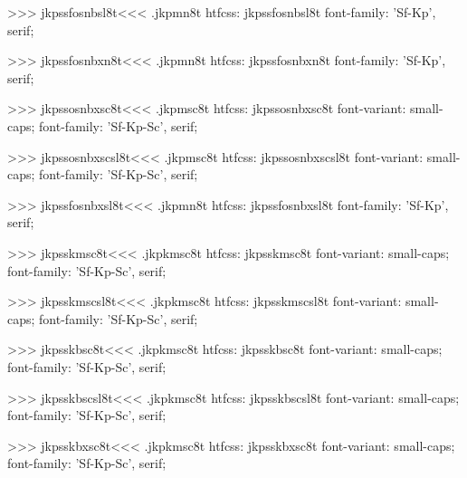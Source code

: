 >>>
\<jkpssfosnbsl8t\><<<
.jkpmn8t
htfcss:  jkpssfosnbsl8t  font-family: 'Sf-Kp', serif;

>>>
\<jkpssfosnbxn8t\><<<
.jkpmn8t
htfcss:  jkpssfosnbxn8t  font-family: 'Sf-Kp', serif;

>>>
\<jkpssosnbxsc8t\><<<
.jkpmsc8t
htfcss:  jkpssosnbxsc8t  font-variant: small-caps; font-family: 'Sf-Kp-Sc', serif;

>>>
\<jkpssosnbxscsl8t\><<<
.jkpmsc8t
htfcss:  jkpssosnbxscsl8t  font-variant: small-caps; font-family: 'Sf-Kp-Sc', serif;

>>>
\<jkpssfosnbxsl8t\><<<
.jkpmn8t
htfcss:  jkpssfosnbxsl8t  font-family: 'Sf-Kp', serif;

>>>
\<jkpsskmsc8t\><<<
.jkpkmsc8t
htfcss:  jkpsskmsc8t  font-variant: small-caps; font-family: 'Sf-Kp-Sc', serif;

>>>
\<jkpsskmscsl8t\><<<
.jkpkmsc8t
htfcss:  jkpsskmscsl8t  font-variant: small-caps; font-family: 'Sf-Kp-Sc', serif;

>>>
\<jkpsskbsc8t\><<<
.jkpkmsc8t
htfcss:  jkpsskbsc8t  font-variant: small-caps; font-family: 'Sf-Kp-Sc', serif;

>>>
\<jkpsskbscsl8t\><<<
.jkpkmsc8t
htfcss:  jkpsskbscsl8t  font-variant: small-caps; font-family: 'Sf-Kp-Sc', serif;

>>>
\<jkpsskbxsc8t\><<<
.jkpkmsc8t
htfcss:  jkpsskbxsc8t  font-variant: small-caps; font-family: 'Sf-Kp-Sc', serif;

